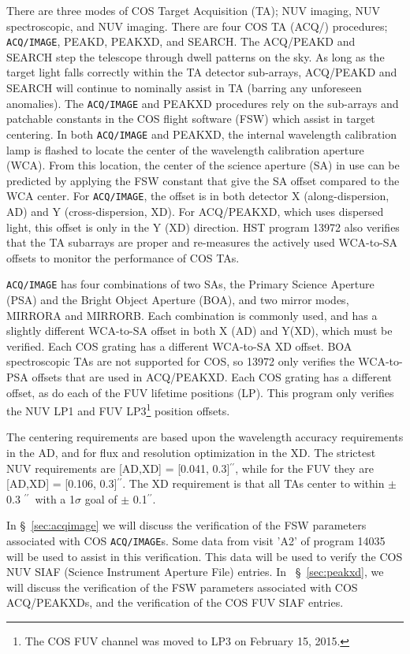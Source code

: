 \documentclass[12pt]{reportj}
\def\arcsec{\hbox{$^{\prime\prime}$}}
\begin{document}
There are three modes of COS Target Acquisition (TA); NUV imaging, NUV spectroscopic, and NUV imaging.
There are four COS TA (ACQ/) procedures; \texttt{ACQ/IMAGE}, PEAKD, PEAKXD, and SEARCH. The ACQ/PEAKD and SEARCH
step the telescope through dwell patterns on the sky. As long as the target light falls correctly within
the TA detector sub-arrays, ACQ/PEAKD and SEARCH will continue to nominally assist in TA (barring any
unforeseen anomalies). The \texttt{ACQ/IMAGE} and PEAKXD procedures rely on the sub-arrays and patchable constants
in the COS flight software (FSW) which assist in target centering. In both \texttt{ACQ/IMAGE} and PEAKXD, the internal
wavelength calibration lamp is flashed to locate the center of the wavelength calibration aperture (WCA). From this location, the center of the
science aperture (SA) in use can be predicted by applying the FSW constant that give the SA offset compared to the WCA center. For \texttt{ACQ/IMAGE},
the offset is in both detector X (along-dispersion, AD) and Y (cross-dispersion, XD). For ACQ/PEAKXD, which
uses dispersed light, this offset is only in the Y (XD) direction. HST program 13972 also verifies that the TA subarrays
are proper and re-measures the actively used WCA-to-SA offsets to monitor the performance of COS TAs.

\texttt{ACQ/IMAGE} has four combinations of two SAs, the Primary Science Aperture (PSA) and the Bright
Object Aperture (BOA), and two mirror modes, MIRRORA and MIRRORB. Each combination is commonly used, and has a slightly different
WCA-to-SA offset in both X (AD) and Y(XD), which must be verified. Each COS grating has a different WCA-to-SA XD offset.
BOA spectroscopic TAs are not supported for COS, so 13972 only verifies the WCA-to-PSA offsets that are used in ACQ/PEAKXD.
Each COS grating has a different offset, as do each of the FUV lifetime positions (LP). This program only verifies the NUV LP1
and FUV LP3\footnote{The COS FUV channel was moved to LP3 on February 15, 2015.} position offsets.

The centering requirements are based upon the wavelength accuracy requirements in the AD, and for flux and resolution optimization
in the XD. The strictest NUV requirements are [AD,XD] = [0.041, 0.3]\arcsec, while for the FUV they are [AD,XD] = [0.106, 0.3]\arcsec. The XD
requirement is that all TAs center to within $\pm$ 0.3 \arcsec\ with a 1$\sigma$ goal of $\pm$ 0.1\arcsec.

In \S~\ref{sec:acqimage} we will discuss the verification of the FSW parameters associated with COS \texttt{ACQ/IMAGE}s.
Some data from visit 'A2' of program 14035 will be used to assist in this verification. This data will be used to verify
the COS NUV SIAF (Science Instrument Aperture File) entries. In ~\S~\ref{sec:peakxd},
we will discuss the verification of the FSW parameters associated with COS ACQ/PEAKXDs, and the verification of the
COS FUV SIAF entries.
\end{document}
